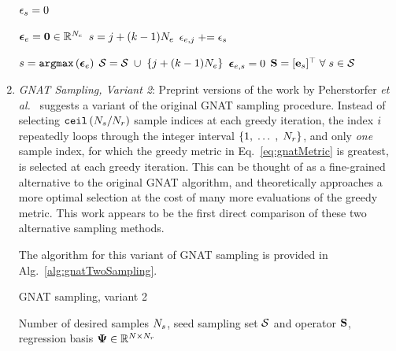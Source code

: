 \begin{enumerate}
\begin{algorithm}
\begin{algorithmic}
				\FORALL{$\sampIdx \in \sampSet$}
					\STATE $\epsilon_{s} = 0$ 
				\ENDFOR
	
				\STATE $\boldsymbol{\epsilon}_{e} = \mathbf{0} \in \mathbb{R}^{N_{e}}$
						\STATE $s = j + (k - 1) N_{e}$
						\STATE $\epsilon_{e,j} \mathrel{+}= \epsilon_{s}$ 
					\ENDFOR
				\ENDFOR
				
					\STATE $s = \mathtt{argmax} \left( \boldsymbol{\epsilon}_{e} \right)$
						\STATE $\mathcal{S} = \mathcal{S} \; \cup \; \{j + (k - 1) N_{e}\} $ 
					\ENDFOR
					\STATE $\boldsymbol{\epsilon}_{e,s} = 0$
					\STATE $\mathbf{S} = [\mathbf{e}_{s}]^\top \; \forall \; s \in \mathcal{S}$
				\ENDFOR
				
			\ENDFOR
		\end{algorithmic}
	\end{algorithm}

	\item \textit{GNAT Sampling, Variant 2}: Preprint versions of the work by Peherstorfer \textit{et al.}~\cite{Peherstorfer2020} suggests a variant of the original GNAT sampling procedure. Instead of selecting $\text{\texttt{ceil}}\left(N_s / N_r\right)$ sample indices at each greedy iteration, the index $i$ repeatedly loops through the integer interval $\{1, \; \hdots \;, \; N_r\}$, and only \textit{one} sample index, for which the greedy metric in Eq.~\ref{eq:gnatMetric} is greatest, is selected at each greedy iteration. This can be thought of as a fine-grained alternative to the original GNAT algorithm, and theoretically approaches a more optimal selection at the cost of many more evaluations of the greedy metric. This work appears to be the first direct comparison of these two alternative sampling methods.
	
	The algorithm for this variant of GNAT sampling is provided in Alg.~\ref{alg:gnatTwoSampling}.

	\begin{algorithm}
		\caption{GNAT sampling, variant 2}\label{alg:gnatTwoSampling}
		\begin{algorithmic}
			\REQUIRE Number of desired samples $N_s$, seed sampling set $\mathcal{S}$ and operator $\mathbf{S}$, regression basis $\deimBasis \inRTwo{\numDOF}{\numResModes}$ 
	

\end{algorithmic}
\end{algorithm}
\end{enumerate}
